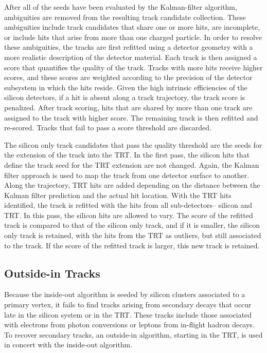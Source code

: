 After all of the seeds have been evaluated by the Kalman-filter
algorithm, ambiguities are removed from the resulting track candidate
collection. These ambiguities include track candidates that share one
or more hits, are incomplete, or include hits that arise from more
than one charged particle. In order to resolve these ambiguities, the
tracks are first refitted using a detector geometry with a more
realistic description of the detector material. Each track is then
assigned a score that quantifies the quality of the track. Tracks with
more hits receive higher scores, and these scores are weighted
according to the precision of the detector subsystem in which the hits
reside. Given the high intrinsic efficiencies of the silicon
detectors, if a hit is absent along a track trajectory, the track
score is penalized. After track scoring, hits that are shared by more
than one track are assigned to the track with higher score. The
remaining track is then refitted and re-scored. Tracks that fail to
pass a score threshold are discarded.

The silicon only track candidates that pass the quality threshold are
the seeds for the extension of the track into the TRT. In
the first pass, the silicon hits that define the track seed for the
TRT extension are not changed. Again, the Kalman filter approach is
used to map the track from one detector surface to another. Along the
trajectory, TRT hits are added depending on the distance between the
Kalman filter prediction and the actual hit location. With the TRT hits
identified, the track is refitted with the hits from all
sub-detectors-- silicon and TRT. In this pass, the silicon hits are
allowed to vary. The score of the refitted track is compared to that of
the silicon only track, and if it is smaller, the silicon only track
is retained, with the hits from the TRT as outliers, but still
associated to the track. If the score of the refitted track is larger,
this new track is retained. 

\subsection{Outside-in Tracks}

Because the inside-out algorithm is seeded by silicon clusters
associated to a primary vertex, it fails to find tracks arising from
secondary decays that occur late in the silicon system or in the
TRT. These tracks include those associated with electrons
from photon conversions or leptons from in-flight hadron
decays. To recover secondary tracks, an outside-in algorithm, starting
in the TRT, is used in concert with the inside-out algorithm. 

